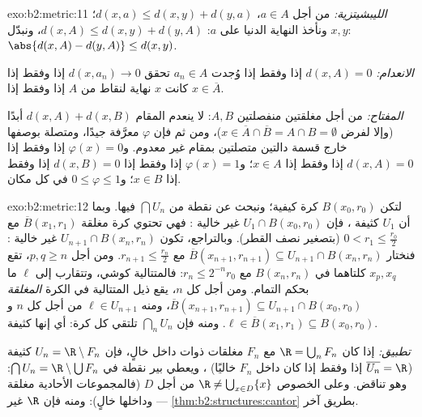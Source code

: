 \begin{solution}{exo:b2:metric:11}
\emph{الليبشيتزية:} من أجل $a \in A$، $d(x, a) \leq d(x, y) + d(y,
a)$؛ ونأخذ النهاية الدنيا على $a$: $d(x, A) \leq d(x, y) + d(y,
A)$، ونبدّل $x, y$: $\abs{d(x,A) - d(y,A)} \leq d(x,y)$.

\emph{الانعدام:} $d(x, A) = 0$ إذا وفقط إذا وُجدت $a_n \in A$ تحقق
$d(x, a_n) \to 0$ إذا وفقط إذا كانت $x$ نهاية لنقاط من $A$ إذا وفقط إذا $x \in
\overline A$.

\emph{المفتاح:} من أجل مغلقتين منفصلتين $A, B$: لا ينعدم المقام
$d(x,A) + d(x,B)$ أبدًا (وإلا لفرض $x \in \overline
A \cap \overline B = A \cap B = \emptyset$)، ومن ثم فإن $\varphi$ معرَّفة
جيدًا، ومتصلة بوصفها خارج قسمة دالتين متصلتين
بمقام غير معدوم. و$\varphi(x) = 0$ إذا وفقط إذا $d(x, A) = 0$
إذا وفقط إذا $x \in A$؛ و$\varphi(x) = 1$ إذا وفقط إذا $d(x, B) = 0$ إذا وفقط إذا $x \in B$؛
و$0 \leq \varphi \leq 1$ في كل مكان.
\end{solution}

\begin{solution}{exo:b2:metric:12}
لتكن $B(x_0, r_0)$ كرة كيفية؛ ونبحث عن نقطة من $\bigcap U_n$
فيها. وبما أن $U_1$ كثيفة ، فإن $U_1 \cap B(x_0, r_0)$
غير خالية : فهي تحتوي كرة مغلقة $\overline B(x_1,
r_1)$ مع $0 < r_1 \leq \frac{r_0}2$ (بتصغير نصف القطر).
وبالتراجع، تكون $U_{n+1} \cap B(x_n, r_n)$ غير خالية : فنختار
$\overline B(x_{n+1}, r_{n+1}) \subseteq U_{n+1} \cap B(x_n,
r_n)$ مع $r_{n+1} \leq \frac{r_n}2$. ومن أجل $p, q \geq n$، تقع
$x_p, x_q$ كلتاهما في $B(x_n, r_n)$ مع $r_n \leq 2^{-n}r_0$: فالمتتالية
كوشي، وتتقارب إلى $\ell$ ما بحكم
التمام. ومن أجل كل $n$، يقع ذيل المتتالية في الكرة
\emph{المغلقة} $\overline B(x_{n+1}, r_{n+1}) \subseteq U_{n+1}
\cap B(x_0, r_0)$، ومنه $\ell \in U_{n+1}$ من أجل كل $n$ و$\ell
\in \overline B(x_1, r_1) \subseteq B(x_0, r_0)$. ومنه فإن
$\bigcap_n U_n$ تلتقي كل كرة: أي إنها كثيفة.

\emph{تطبيق:} إذا كان $\R = \bigcup_n F_n$ مع $F_n$ مغلقات
ذوات داخل خالٍ، فإن $U_n = \R \setminus F_n$ كثيفة
($\overline{U_n} = \R$ إذا وفقط إذا كان داخل $F_n$ خاليًا) ،
ويعطي بير نقطة في $\bigcap U_n = \R \setminus \bigcup
F_n$: وهو تناقض. وعلى الخصوص $\R \neq \bigcup_{x \in D}
\{x\}$ من أجل $D$  (فالمجموعات الأحادية مغلقة وداخلها
خالٍ): ومنه فإن $\R$ غير  ---
\cref{thm:b2:structures:cantor} بطريق آخر.
\end{solution}

